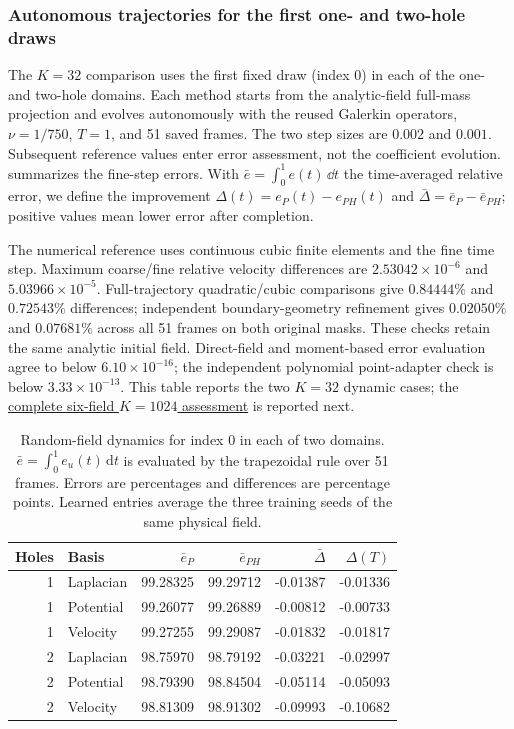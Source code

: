\subsubsection{Autonomous trajectories for the first one- and two-hole draws}
\label{app:random-dynamics}
The $K=32$ comparison uses the first fixed draw (index 0) in each of the one- and two-hole domains. Each method starts from the analytic-field full-mass projection and evolves autonomously with the reused Galerkin operators, $\nu=1/750$, $T=1$, and 51 saved frames. The two step sizes are $0.002$ and $0.001$. Subsequent reference values enter error assessment, not the coefficient evolution.  summarizes the fine-step errors. {With $\bar e=\int_0^1e(t)\,\dd t$ the time-averaged relative error, we define the improvement $\Delta(t)=e_P(t)-e_{PH}(t)$ and $\bar\Delta=\bar e_P-\bar e_{PH}$; positive values mean lower error after completion.}

The numerical reference uses continuous cubic finite elements and the fine time step. Maximum coarse/fine relative velocity differences are $2.53042\times10^{-6}$ and $5.03966\times10^{-5}$. Full-trajectory quadratic/cubic comparisons give $0.84444\%$ and $0.72543\%$ differences; independent boundary-geometry refinement gives $0.02050\%$ and $0.07681\%$ across all 51 frames on both original masks. These checks retain the same analytic initial field. Direct-field and moment-based error evaluation agree to below $6.10\times10^{-16}$; the independent polynomial point-adapter check is below $3.33\times10^{-13}$. This table reports the two $K=32$ dynamic cases; the \hyperref[app:random-k1024-six]{complete six-field $K=1024$ assessment} is reported next.

\begin{table}[!htb]\centering\small
\caption{Random-field dynamics for index 0 in each of two domains. $\bar e=\int_0^1e_u(t)\,\mathrm dt$ is evaluated by the trapezoidal rule over 51 frames. Errors are percentages and differences are percentage points. Learned entries average the three training seeds of the same physical field.}
\label{tab:random-dynamics}
\begin{tabular}{rlrrrr}\toprule
Holes&Basis&$\bar e_P$&$\bar e_{PH}$&$\bar\Delta$&$\Delta(T)$\\\midrule
1&Laplacian&99.28325&99.29712&-0.01387&-0.01336\\
1&Potential&99.26077&99.26889&-0.00812&-0.00733\\
1&Velocity&99.27255&99.29087&-0.01832&-0.01817\\
2&Laplacian&98.75970&98.79192&-0.03221&-0.02997\\
2&Potential&98.79390&98.84504&-0.05114&-0.05093\\
2&Velocity&98.81309&98.91302&-0.09993&-0.10682\\
\bottomrule\end{tabular}\end{table}



